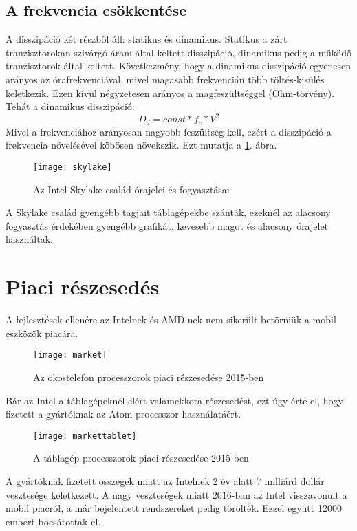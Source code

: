 \subsection{A frekvencia csökkentése}
A disszipáció két részből áll: statikus és dinamikus.
Statikus a zárt tranzisztorokan szivárgó áram által keltett disszipáció, dinamikus pedig a működő tranzisztorok által keltett.
Következmény, hogy a dinamikus disszipáció egyenesen arányos az órafrekvenciával, mivel magasabb frekvencián több töltés-kisülés keletkezik.
Ezen kívül négyzetesen arányos a magfeszültséggel (Ohm-törvény).
Tehát a dinamikus disszipáció:
\begin{equation}
    D_d = const * f_c * V^2
\end{equation}
Mivel a frekvenciához arányosan nagyobb feszültség kell, ezért a disszipáció a frekvencia növelésével köbösen növekszik.
Ezt mutatja a \ref{fig:skylake}. ábra.
\begin{figure}[H]
    \texttt{[image: skylake]}
    \centering
    \caption{Az Intel Skylake család órajelei és fogyasztásai}
    \label{fig:skylake}
\end{figure}

A Skylake család gyengébb tagjait táblagépekbe szánták, ezeknél az alacsony fogyasztás érdekében gyengébb grafikát, kevesebb magot és alacsony órajelet használtak.

\section{Piaci részesedés}
A fejlesztések ellenére az Intelnek és AMD-nek nem sikerült betörniük a mobil eszközök piacára.

\begin{figure}[H]
    \texttt{[image: market]}
    \centering
    \caption{Az okostelefon processzorok piaci részesedése 2015-ben}
    \label{fig:market}
\end{figure}

Bár az Intel a táblagépeknél elért valamekkora részesedést, ezt úgy érte el, hogy fizetett a gyártóknak az Atom processzor használatáért.

\begin{figure}[H]
    \texttt{[image: markettablet]}
    \centering
    \caption{A táblagép processzorok piaci részesedése 2015-ben}
    \label{fig:markettablet}
\end{figure}

A gyártóknak fizetett összegek miatt az Intelnek 2 év alatt 7 milliárd dollár vesztesége keletkezett.
A nagy veszteségek miatt 2016-ban az Intel visszavonult a mobil piacról, a már bejelentett rendszereket pedig törölték.
Ezzel együtt 12000 embert bocsátottak el.

